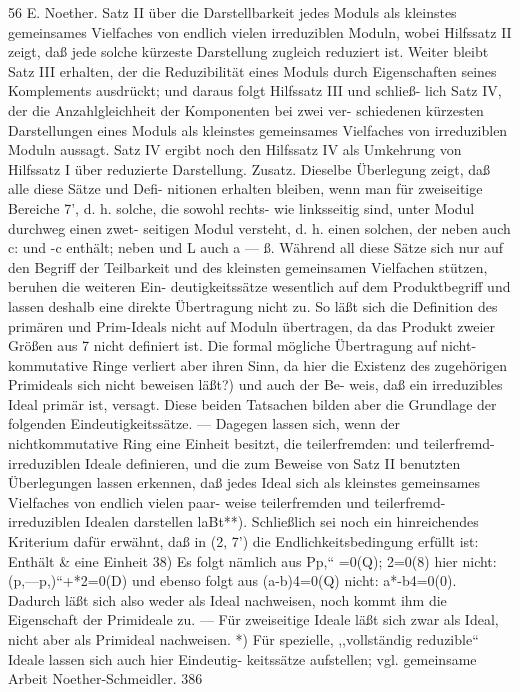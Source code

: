 \documentclass[11pt,a4paper]{article}
\theoremstyle{plain}
\theoremstyle{definition}
\begin{document}
56 
E. Noether. 
Satz II über die Darstellbarkeit jedes Moduls als kleinstes gemeinsames 
Vielfaches von endlich vielen irreduziblen Moduln, wobei Hilfssatz II zeigt, 
daß jede solche kürzeste Darstellung zugleich reduziert ist. Weiter bleibt 
Satz III erhalten, der die Reduzibilität eines Moduls durch Eigenschaften 
seines Komplements ausdrückt; und daraus folgt Hilfssatz III und schließ- 
lich Satz IV, der die Anzahlgleichheit der Komponenten bei zwei ver- 
schiedenen kürzesten Darstellungen eines Moduls als kleinstes gemeinsames 
Vielfaches von irreduziblen Moduln 
aussagt. 
Satz IV ergibt noch den 
Hilfssatz IV als Umkehrung von Hilfssatz I über reduzierte Darstellung. 
Zusatz. 
Dieselbe Überlegung zeigt, daß alle diese Sätze und Defi- 
nitionen erhalten bleiben, wenn man für zweiseitige Bereiche 7', d. h. solche, 
die sowohl rechts- wie linksseitig sind, unter Modul durchweg einen zwet- 
seitigen Modul versteht, 
d. h. einen solchen, der neben \guillemotleft{} auch c:\guillemotleft{} und 
\guillemotleft{}-c enthält; neben \guillemotleft{} und L auch a --- ß. 
Während all diese Sätze sich nur auf den Begriff der Teilbarkeit und 
des kleinsten gemeinsamen Vielfachen stützen, beruhen die weiteren Ein- 
deutigkeitssätze wesentlich auf dem Produktbegriff und lassen deshalb eine 
direkte Übertragung nicht zu. 
So läßt sich die Definition des primären 
und Prim-Ideals 
nicht auf Moduln übertragen, 
da das Produkt zweier 
Größen aus 7 nicht definiert 
ist. 
Die formal mögliche Übertragung auf 
nicht-kommutative Ringe verliert aber ihren Sinn, da hier die Existenz 
des zugehörigen Primideals sich nicht beweisen läßt?) und auch der Be- 
weis, daß ein irreduzibles Ideal primär ist, versagt. 
Diese beiden Tatsachen 
bilden aber die Grundlage der folgenden Eindeutigkeitssätze. --- Dagegen 
lassen 
sich, wenn 
der nichtkommutative Ring eine Einheit besitzt, 
die 
teilerfremden: und teilerfremd-irreduziblen Ideale definieren, und die zum 
Beweise von Satz II benutzten Überlegungen lassen erkennen, daß jedes 
Ideal sich als kleinstes gemeinsames Vielfaches von endlich vielen paar- 
weise teilerfremden und teilerfremd-irreduziblen Idealen darstellen laBt**). 
Schließlich sei noch ein hinreichendes Kriterium dafür erwähnt, daß 
in (2, 7') die Endlichkeitsbedingung erfüllt ist: Enthält \& eine Einheit 
38) Es folgt nämlich aus 
Pp,`` =0(Q); 
2\guillemotright{}\textdegree{}=0(8) 
hier nicht: 
(p,---p,)``+*2=0(D) 
und ebenso folgt aus 
(a-b)4=0(Q) 
nicht: 
a*-b4=0(0). 
Dadurch läßt sich also  weder als Ideal nachweisen, noch kommt ihm die Eigenschaft 
der Primideale zu. --- Für zweiseitige Ideale läßt  sich zwar als Ideal, nicht aber als 
Primideal nachweisen. 
*\textdegree{}) Für spezielle, ,,vollständig reduzible`` Ideale lassen sich auch hier Eindeutig- 
keitssätze aufstellen; vgl. gemeinsame Arbeit Noether-Schmeidler. 
386
\end{document}
